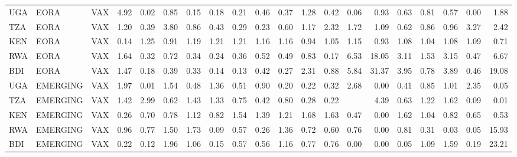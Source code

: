 \documentclass[a4paper]{article}
\begin{document}
\begin{table}[ht]
{\begin{tabular}{lllrrrrrrrrrrrrrrrrr}
  UGA & EORA & VAX & 4.92 & 0.02 & 0.85 & 0.15 & 0.18 & 0.21 & 0.46 & 0.37 & 1.28 & 0.42 & 0.06 & 0.93 & 0.63 & 0.81 & 0.57 & 0.00 & 1.88 \\ 
  TZA & EORA & VAX & 1.20 & 0.39 & 3.80 & 0.86 & 0.43 & 0.29 & 0.23 & 0.60 & 1.17 & 2.32 & 1.72 & 1.09 & 0.62 & 0.86 & 0.96 & 3.27 & 2.42 \\ 
  KEN & EORA & VAX & 0.14 & 1.25 & 0.91 & 1.19 & 1.21 & 1.21 & 1.16 & 1.16 & 0.94 & 1.05 & 1.15 & 0.93 & 1.08 & 1.04 & 1.08 & 1.09 & 0.71 \\ 
  RWA & EORA & VAX & 1.64 & 0.32 & 0.72 & 0.34 & 0.24 & 0.36 & 0.52 & 0.49 & 0.83 & 0.17 & 6.53 & 18.05 & 3.11 & 1.53 & 3.15 & 0.47 & 6.67 \\ 
  BDI & EORA & VAX & 1.47 & 0.18 & 0.39 & 0.33 & 0.14 & 0.13 & 0.42 & 0.27 & 2.31 & 0.88 & 5.84 & 31.37 & 3.95 & 0.78 & 3.89 & 0.46 & 19.08 \\ \midrule
  UGA & EMERGING & VAX & 1.97 & 0.01 & 1.54 & 0.48 & 1.36 & 0.51 & 0.90 & 0.20 & 0.22 & 0.32 & 2.68 & 0.00 & 0.41 & 0.85 & 1.01 & 2.35 & 0.05 \\ 
  TZA & EMERGING & VAX & 1.42 & 2.99 & 0.62 & 1.43 & 1.33 & 0.75 & 0.42 & 0.80 & 0.28 & 0.22 &  & 4.39 & 0.63 & 1.22 & 1.62 & 0.09 & 0.01 \\ 
  KEN & EMERGING & VAX & 0.26 & 0.70 & 0.78 & 1.12 & 0.82 & 1.54 & 1.39 & 1.21 & 1.68 & 1.63 & 0.47 & 0.00 & 1.62 & 1.04 & 0.82 & 0.65 & 0.53 \\ 
  RWA & EMERGING & VAX & 0.96 & 0.77 & 1.50 & 1.73 & 0.09 & 0.57 & 0.26 & 1.36 & 0.72 & 0.60 & 0.76 & 0.00 & 0.81 & 0.31 & 0.03 & 0.05 & 15.93 \\ 
  BDI & EMERGING & VAX & 0.22 & 0.12 & 1.96 & 1.06 & 0.15 & 0.57 & 0.56 & 1.16 & 0.77 & 0.76 & 0.00 & 0.00 & 0.05 & 1.09 & 1.59 & 0.19 & 23.21 \\
   \bottomrule
\end{tabular}
}
\end{table}
\end{document}
